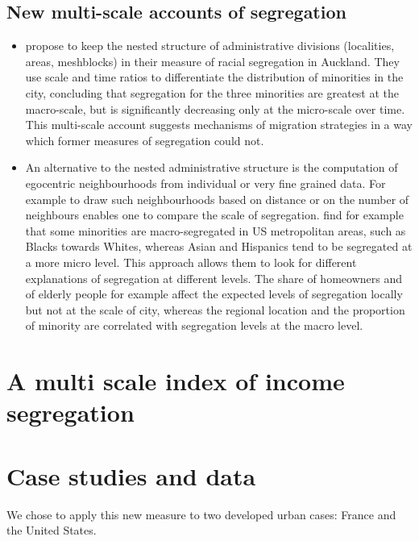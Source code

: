 \documentclass[11.5pt]{article}
\begin{document}
\subsection{New multi-scale accounts of segregation}

\begin{itemize}
\item \cite{manley_macro-_2015} propose to keep the nested structure of administrative divisions (localities, areas, meshblocks) in their measure of racial segregation in Auckland. They use scale and time ratios to differentiate the distribution of minorities in the city, concluding that segregation for the three minorities are greatest at the macro-scale, but is significantly decreasing only at the micro-scale over time. This multi-scale account suggests mechanisms of migration strategies in a way which former measures of segregation could not.
\item An alternative to the nested administrative structure is the computation of egocentric neighbourhoods from individual or very fine grained data. For example to draw such neighbourhoods based on distance \cite{lee_beyond_2008, andersson_what_2010} or on the number of neighbours \cite{andersson_contextual_2015} enables one to compare the scale of segregation. \cite{lee_beyond_2008} find for example that some minorities are macro-segregated in US metropolitan areas, such as Blacks towards Whites, whereas Asian and Hispanics tend to be segregated at a more micro level. This approach allows them to look for different explanations of segregation at different levels. The share of homeowners and of elderly people for example affect the expected levels of segregation locally but not at the scale of city, whereas the regional location and the proportion of minority are correlated with segregation levels at the macro level.
\end{itemize}

\section{A multi scale index of income segregation}


\section{Case studies and data}

We chose to apply this new measure to two developed urban cases: France and the United States.
\end{document}
